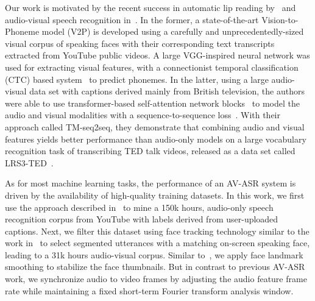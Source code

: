 \documentclass{article}
\newcommand{\lrsted}{\textsc{LRS3-TED}\xspace}
\begin{document}
Our work is motivated by the recent success in automatic lip reading
by~\citet{dm_lsvsr_2018} and audio-visual speech recognition
in~\citet{ox_davsr_2018,Petridis2018AudioVisualSR}. In the former, a
state-of-the-art Vision-to-Phoneme model (V2P) is developed using a
carefully and unprecedentedly-sized visual corpus of speaking faces
with their corresponding text transcripts extracted from YouTube
public videos. A large VGG-inspired neural network was used for
extracting visual features, with a connectionist temporal
classification (CTC) based system~\citet{ctc06} to predict
phonemes. In the latter, using a large audio-visual data set with
captions derived mainly from British television, the authors were able
to use transformer-based self-attention network
blocks~\citet{xformer17nips} to model the audio and visual modalities
with a sequence-to-sequence loss~\citet{seq2seq14cho}. With their
approach called TM-seq2seq, they demonstrate that combining audio and
visual features yields better performance than audio-only models on a
large vocabulary recognition task of transcribing TED talk videos,
released as a data set called \lrsted~\citet{lrs3ted}.

As for most machine learning tasks, the performance of an AV-ASR
system is driven by the availability of high-quality training
datasets. In this work, we first use the approach described
in~\citet{liao13asru} to mine a 150k hours, audio-only speech
recognition corpus from YouTube with labels derived from user-uploaded
captions. Next, we filter this dataset using face tracking technology
similar to the work in~\citet{lrs3ted,dm_lsvsr_2019} to select
segmented utterances with a matching on-screen speaking face, leading
to a 31k hours audio-visual corpus.
Similar to~\citet{dm_lsvsr_2019}, we apply face landmark smoothing to
stabilize the face thumbnails. But in contrast to previous AV-ASR
work, we synchronize audio to video frames by adjusting the audio
feature frame rate while maintaining a fixed short-term Fourier
transform analysis window.
\end{document}

